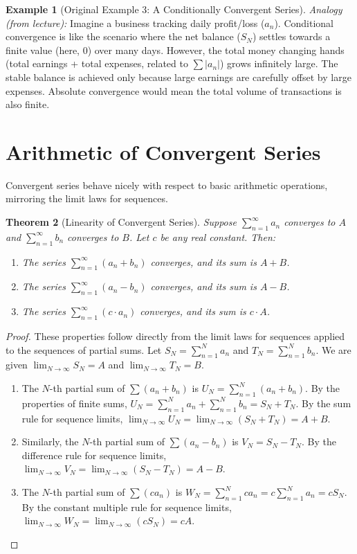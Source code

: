 \documentclass[11pt, letterpaper]{article}
\theoremstyle{plain} %
\newtheorem{theorem}{Theorem}[section] %
\theoremstyle{definition} %
\newtheorem{example}[theorem]{Example} %
\theoremstyle{remark} %
\begin{document}
\begin{example}[Original Example 3: A Conditionally Convergent Series]
\textit{Analogy (from lecture):} Imagine a business tracking daily profit/loss ($a_n$). Conditional convergence is like the scenario where the net balance ($S_N$) settles towards a finite value (here, 0) over many days. However, the total money changing hands (total earnings + total expenses, related to $\sum |a_n|$) grows infinitely large. The stable balance is achieved only because large earnings are carefully offset by large expenses. Absolute convergence would mean the total volume of transactions is also finite.
\end{example}

\section{Arithmetic of Convergent Series}

Convergent series behave nicely with respect to basic arithmetic operations, mirroring the limit laws for sequences.

\begin{theorem}[Linearity of Convergent Series]
Suppose $\sum_{n=1}^{\infty} a_n$ converges to $A$ and $\sum_{n=1}^{\infty} b_n$ converges to $B$. Let $c$ be any real constant. Then:
\begin{enumerate}
    \item The series $\sum_{n=1}^{\infty} (a_n + b_n)$ converges, and its sum is $A + B$.
    \item The series $\sum_{n=1}^{\infty} (a_n - b_n)$ converges, and its sum is $A - B$.
    \item The series $\sum_{n=1}^{\infty} (c \cdot a_n)$ converges, and its sum is $c \cdot A$.
\end{enumerate}
\end{theorem}

\begin{proof}
These properties follow directly from the limit laws for sequences applied to the sequences of partial sums. Let $S_N = \sum_{n=1}^N a_n$ and $T_N = \sum_{n=1}^N b_n$. We are given $\lim_{N \to \infty} S_N = A$ and $\lim_{N \to \infty} T_N = B$.
\begin{enumerate}
    \item The $N$-th partial sum of $\sum (a_n + b_n)$ is $U_N = \sum_{n=1}^N (a_n + b_n)$. By the properties of finite sums, $U_N = \sum_{n=1}^N a_n + \sum_{n=1}^N b_n = S_N + T_N$. By the sum rule for sequence limits, $\lim_{N \to \infty} U_N = \lim_{N \to \infty} (S_N + T_N) = A + B$.
    \item Similarly, the $N$-th partial sum of $\sum (a_n - b_n)$ is $V_N = S_N - T_N$. By the difference rule for sequence limits, $\lim_{N \to \infty} V_N = \lim_{N \to \infty} (S_N - T_N) = A - B$.
    \item The $N$-th partial sum of $\sum (c a_n)$ is $W_N = \sum_{n=1}^N c a_n = c \sum_{n=1}^N a_n = c S_N$. By the constant multiple rule for sequence limits, $\lim_{N \to \infty} W_N = \lim_{N \to \infty} (c S_N) = c A$.
\end{enumerate}
\end{proof}
\end{document}
